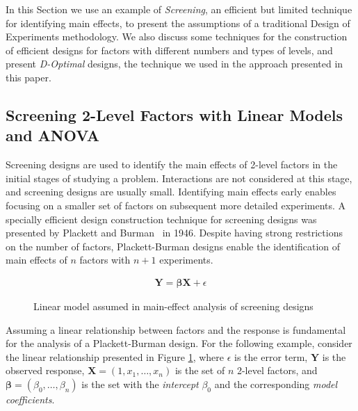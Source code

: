 \documentclass[conference]{IEEEtran}
\begin{document}
In this Section we use an example of \emph{Screening}, an efficient but limited
technique for identifying main effects, to present the assumptions of a
traditional Design of Experiments methodology. We also discuss some techniques
for the construction of efficient designs for factors with different numbers and
types of levels, and present \emph{D-Optimal} designs, the technique we used in the
approach presented in this paper.
\subsection{Screening 2-Level Factors with Linear Models and ANOVA}
\label{sec:org41e5777}
Screening designs are used to identify the main effects of 2-level factors in
the initial stages of studying a problem. Interactions are not considered at
this stage, and screening designs are usually small. Identifying main effects
early enables focusing on a smaller set of factors on subsequent more detailed
experiments. A specially efficient design construction technique for screening
designs was presented by Plackett and Burman~\cite{plackett1946design}
in 1946. Despite having strong restrictions on the number of factors,
Plackett-Burman designs enable the identification of main effects of \(n\) factors
with \(n + 1\) experiments.

\begin{figure}
{\normalsize
\begin{align*}
\mathbf{Y} = \bm{\beta}\mathbf{X} + \epsilon
\end{align*}
}
\caption{Linear model assumed in main-effect analysis of screening designs}
\label{fig:linear_assumption}
\end{figure}

Assuming a linear relationship between factors and the response is fundamental
for the analysis of a Plackett-Burman design. For the following example,
consider the linear relationship presented in Figure
\ref{fig:linear_assumption}, where \(\epsilon\) is the error term, \(\mathbf{Y}\) is
the observed response, \(\mathbf{X} = \left(1, x_1,\dots,x_n\right)\) is the set
of \(n\) 2-level factors, and \(\bm{\beta} = \left(\beta_0,\dots,\beta_n\right)\) is
the set with the \emph{intercept} \(\beta_0\) and the corresponding \emph{model
coefficients}.
\end{document}
